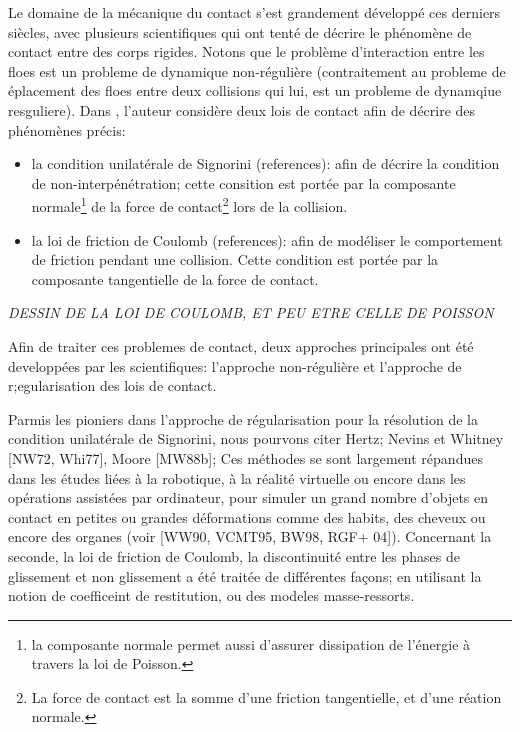 Le domaine de la mécanique du contact s'est grandement développé ces derniers siècles, avec plusieurs scientifiques qui ont tenté de décrire le phénomène de contact entre des corps rigides. Notons que le problème d'interaction entre les floes est un probleme de dynamique non-régulière (contraitement au probleme de éplacement des floes entre deux collisions qui lui, est un probleme de dynamqiue resguliere). Dans \parencite{rabatel2015thesis}, l'auteur considère deux lois de contact afin de décrire des phénomènes précis:
\begin{itemize}
    \item la condition unilatérale de Signorini (references): afin de décrire la condition de non-interpénétration; cette consition est portée par la composante normale\footnote{la composante normale permet aussi d'assurer dissipation de l'énergie à travers la loi de Poisson.} de la force de contact\footnote{La force de contact est la somme d'une friction tangentielle, et d'une réation normale.} lors de la collision.
    \item la loi de friction de Coulomb (references): afin de modéliser le comportement de friction pendant une collision. Cette condition est portée par la composante tangentielle de la force de contact.
\end{itemize}

\textit{DESSIN DE LA LOI DE COULOMB, ET PEU ETRE CELLE DE POISSON}

\noindent Afin de traiter ces problemes de contact, deux approches principales ont été developpées par les scientifiques: l'approche non-régulière et l'approche de r;egularisation des lois de contact. 

Parmis les pioniers dans l'approche de régularisation pour la résolution de la condition unilatérale de Signorini, nous pourvons citer Hertz; Nevins et Whitney [NW72, Whi77], Moore [MW88b]; Ces méthodes se sont largement répandues dans les études liées à la robotique, à la réalité virtuelle ou encore dans les opérations assistées par ordinateur, pour simuler un grand nombre d’objets en contact en petites ou grandes déformations comme des habits, des cheveux ou encore des organes (voir [WW90, VCMT95, BW98, RGF+ 04]). Concernant la seconde, la loi de friction de Coulomb, la discontinuité entre les phases de glissement et non glissement a été traitée de différentes façons; en utilisant la notion de coefficeint de restitution, ou des modeles masse-ressorts. 
 
